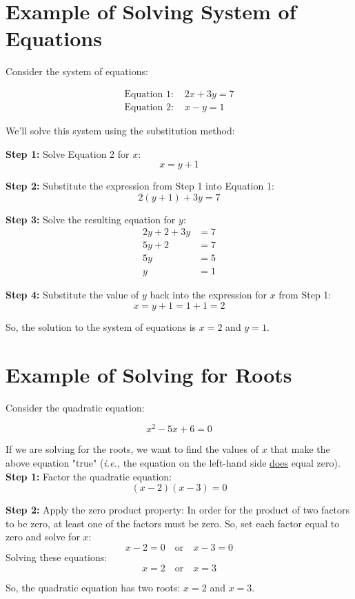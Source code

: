 \documentclass{article}
\begin{document}
\section{Example of Solving System of Equations}
Consider the system of equations:

\begin{align*}
\text{Equation 1: } & 2x + 3y = 7 \\
\text{Equation 2: } & x - y = 1
\end{align*}

We'll solve this system using the substitution method:

\textbf{Step 1:} Solve Equation 2 for \(x\):
\[x = y + 1\]

\textbf{Step 2:} Substitute the expression from Step 1 into Equation 1:
\[2(y + 1) + 3y = 7\]

\textbf{Step 3:} Solve the resulting equation for \(y\):
\begin{align*}
2y + 2 + 3y &= 7 \\
5y + 2 &= 7 \\
5y &= 5 \\
y &= 1
\end{align*}

\textbf{Step 4:} Substitute the value of \(y\) back into the expression for \(x\) from Step 1:
\[x = y + 1 = 1 + 1 = 2\]

So, the solution to the system of equations is \(x = 2\) and \(y = 1\).


\section{Example of Solving for Roots}
Consider the quadratic equation:

\[x^2 - 5x + 6 = 0\]

If we are solving for the roots, we want to find the values of $x$ that make the above equation "true" (\textit{i.e.,} the equation on the left-hand side \underline{does} equal zero).\\

\textbf{Step 1:} Factor the quadratic equation:
\[(x - 2)(x - 3) = 0\]

\textbf{Step 2:} Apply the zero product property:
In order for the product of two factors to be zero, at least one of the factors must be zero. So, set each factor equal to zero and solve for \(x\):
\[x - 2 = 0 \quad \text{or} \quad x - 3 = 0\]
Solving these equations:
\[x = 2 \quad \text{or} \quad x = 3\]

So, the quadratic equation has two roots: \(x = 2\) and \(x = 3\).
\end{document}
